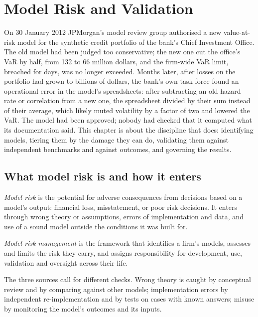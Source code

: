 \chapter{Model Risk and Validation}\label{ch:rc:model-risk-and-validation}

On 30 January 2012 JPMorgan's model review group authorised a new value-at-risk model for the
synthetic credit portfolio of the bank's Chief Investment Office. The old model had been judged
too conservative; the new one cut the office's VaR by half, from 132 to 66 million dollars, and the
firm-wide VaR limit, breached for days, was no longer exceeded. Months later, after losses on the portfolio had grown to billions of dollars, the
bank's own task force found an operational error in the model's spreadsheets: after subtracting
an old hazard rate or correlation from a new one, the spreadsheet divided by their sum instead of
their average, which likely muted volatility by a factor of two and lowered the VaR. The model had
been approved; nobody had checked that it computed what its documentation said. This chapter is
about the discipline that does: identifying models, tiering them by the damage they can do,
validating them against independent benchmarks and against outcomes, and governing the results.

\section{What model risk is and how it enters}

\begin{definition}\label{def:rc:model-risk-and-validation:risk}
\emph{Model risk} is the potential for adverse consequences from decisions
based on a model's output: financial loss, misstatement, or poor risk decisions. It enters through
wrong theory or assumptions, errors of implementation and data, and use of a sound model outside
the conditions it was built for.
\end{definition}

\begin{definition}\label{def:rc:model-risk-and-validation:mrm}
\emph{Model risk management} is the framework that identifies a firm's
models, assesses and limits the risk they carry, and assigns responsibility for development, use,
validation and oversight across their life.
\end{definition}

The three sources call for different checks. Wrong theory is caught by conceptual review and by
comparing against other models; implementation errors by independent re-implementation and by
tests on cases with known answers; misuse by monitoring the model's outcomes and its inputs.


